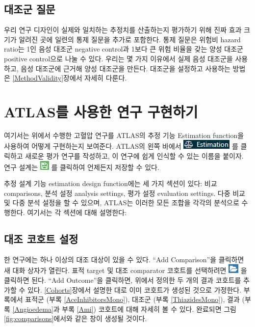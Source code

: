 \documentclass[10.5pt]{book}
\theoremstyle{definition}
\theoremstyle{definition}
\theoremstyle{definition}
\theoremstyle{remark}
\begin{document}
\subsection{대조군 질문}\label{-}

우리 연구 디자인이 실제와 일치하는 추정치를 산출하는지 평가하기 위해
진짜 효과 크기가 알려진 곳에 일련의 통제 질문을 추가로 포함한다. 통제
질문은 위험비 hazard ratio는 1인 음성 대조군 negative control과 1보다 큰
위험 비율을 갖는 양성 대조군 positive control으로 나눌 수 있다. 우리는
몇 가지 이유에서 실제 음성 대조군을 사용하고, 음성 대조군에 근거해 양성
대조군을 만든다. 대조군을 설정하고 사용하는 방법은
\ref{MethodValidity}장에서 자세히 다룬다.

\section{ATLAS를 사용한 연구 구현하기}\label{PleAtlas}

여기서는 위에서 수행한 고혈압 연구를 ATLAS의 추정 기능 Estimation
function을 사용하여 어떻게 구현하는지 보여준다. ATLAS의 왼쪽 바에서
\includegraphics{images/PopulationLevelEstimation/estimation.png} 를
클릭하고 새로운 평가 연구를 작성하고, 이 연구에 쉽게 인식할 수 있는
이름을 붙이자. 연구 설계는
\includegraphics{images/PopulationLevelEstimation/save.png} 를 클릭하여
언제든지 저장할 수 있다.

추정 설계 기능 estimation design function에는 세 가지 섹션이 있다: 비교
comparisons, 분석 설정 analysis settings, 평가 설정 evaluation settings.
다중 비교 및 다중 분석 설정을 할 수 있으며, ATLAS는 이러한 모든 조합을
각각의 분석으로 수행한다. 여기서는 각 섹션에 대해 설명한다:

\subsection{대조 코호트 설정}\label{ComparisonSettings}

한 연구에는 하나 이상의 대조 대상이 있을 수 있다. ``Add Comparison''을
클릭하면 새 대화 상자가 열린다. 표적 target 및 대조 comparator 코호트를
선택하려면 \includegraphics{images/PopulationLevelEstimation/open.png}
을 클릭하면 된다. ``Add Outcome''을 클릭하면, 위에서 정의한 두 개의 결과
코호트를 추가할 수 있다. \ref{Cohorts}장에서 설명한 대로 이미 코호트가
생성된 것으로 가정한다. 부록에서 표적군 (부록 \ref{AceInhibitorsMono}),
대조군 (부록 \ref{ThiazidesMono}), 결과 (부록 \ref{Angioedema}과 부록
\ref{Ami}) 코호트에 대해 자세히 볼 수 있다. 완료되면 그림
\ref{fig:comparisons}에서와 같은 창이 생성될 것이다.
\end{document}
